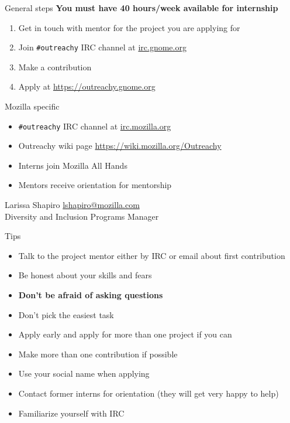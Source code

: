 \documentclass[pdf]{beamer}
\begin{document}
\begin{frame}{General steps}
  \textbf{You must have 40 hours/week available for internship}

  \begin{enumerate}
    \item Get in touch with mentor for the project you are applying for
    \item Join \texttt{\#outreachy} IRC channel at \url{irc.gnome.org}
    \item Make a contribution
    \item Apply at \url{https://outreachy.gnome.org}
  \end{enumerate}
\end{frame}

\begin{frame}{Mozilla specific}
  \begin{itemize}
    \item \texttt{\#outreachy} IRC channel at \url{irc.mozilla.org}
    \item Outreachy wiki page \url{https://wiki.mozilla.org/Outreachy}
    \item Interns join Mozilla All Hands
    \item Mentors receive orientation for mentorship
  \end{itemize}

  \begin{center}
    Larissa Shapiro \href{mailto:lshapiro@mozilla.com}{lshapiro@mozilla.com}\\
    Diversity and Inclusion Programs Manager
  \end{center}
\end{frame}

\begin{frame}{Tips}
  \begin{itemize}
    \item Talk to the project mentor either by IRC or email about first contribution
    \item Be honest about your skills and fears
    \item \textbf{Don't be afraid of asking questions}
    \item Don't pick the easiest task
    \item Apply early and apply for more than one project if you can
    \item Make more than one contribution if possible
    \item Use your social name when applying
    \item Contact former interns for orientation (they will get very happy to help)
    \item Familiarize yourself with IRC
  \end{itemize}
\end{frame}
\end{document}
